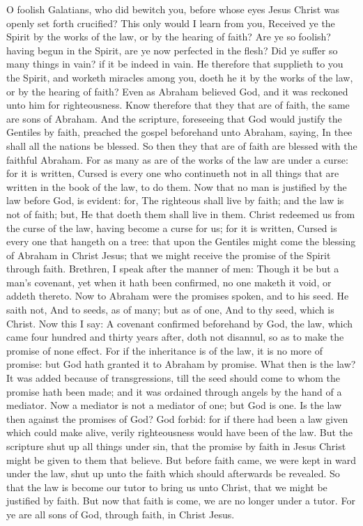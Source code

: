 O foolish Galatians, who did bewitch you, before whose eyes Jesus Christ was openly set forth crucified? This only would I learn from you, Received ye the Spirit by the works of the law, or by the hearing of faith? Are ye so foolish? having begun in the Spirit, are ye now perfected in the flesh? Did ye suffer so many things in vain? if it be indeed in vain. He therefore that supplieth to you the Spirit, and worketh miracles among you, doeth he it by the works of the law, or by the hearing of faith? Even as Abraham believed God, and it was reckoned unto him for righteousness. Know therefore that they that are of faith, the same are sons of Abraham. And the scripture, foreseeing that God would justify the Gentiles by faith, preached the gospel beforehand unto Abraham, saying, In thee shall all the nations be blessed. So then they that are of faith are blessed with the faithful Abraham. For as many as are of the works of the law are under a curse: for it is written, Cursed is every one who continueth not in all things that are written in the book of the law, to do them. Now that no man is justified by the law before God, is evident: for, The righteous shall live by faith; and the law is not of faith; but, He that doeth them shall live in them. Christ redeemed us from the curse of the law, having become a curse for us; for it is written, Cursed is every one that hangeth on a tree: that upon the Gentiles might come the blessing of Abraham in Christ Jesus; that we might receive the promise of the Spirit through faith.  Brethren, I speak after the manner of men: Though it be but a man’s covenant, yet when it hath been confirmed, no one maketh it void, or addeth thereto. Now to Abraham were the promises spoken, and to his seed. He saith not, And to seeds, as of many; but as of one, And to thy seed, which is Christ. Now this I say: A covenant confirmed beforehand by God, the law, which came four hundred and thirty years after, doth not disannul, so as to make the promise of none effect. For if the inheritance is of the law, it is no more of promise: but God hath granted it to Abraham by promise. What then is the law? It was added because of transgressions, till the seed should come to whom the promise hath been made; and it was ordained through angels by the hand of a mediator. Now a mediator is not a mediator of one; but God is one. Is the law then against the promises of God? God forbid: for if there had been a law given which could make alive, verily righteousness would have been of the law. But the scripture shut up all things under sin, that the promise by faith in Jesus Christ might be given to them that believe.  But before faith came, we were kept in ward under the law, shut up unto the faith which should afterwards be revealed. So that the law is become our tutor to bring us unto Christ, that we might be justified by faith. But now that faith is come, we are no longer under a tutor. For ye are all sons of God, through faith, in Christ Jesus. 